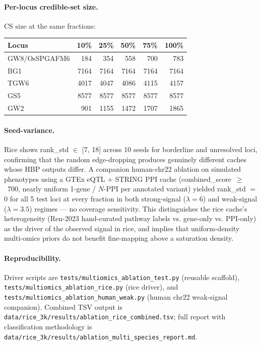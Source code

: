 \paragraph{Per-locus credible-set size.} CS size at the same fractions:

\begin{center}
\begin{tabular}{lrrrrr}
\toprule
\textbf{Locus} & \textbf{10\%} & \textbf{25\%} & \textbf{50\%} & \textbf{75\%} & \textbf{100\%} \\
\midrule
GW8/OsSPGAFM6  &  184 &  354 &  558 &  700 &  783 \\
BG1          & 7164 & 7164 & 7164 & 7164 & 7164 \\
TGW6         & 4017 & 4047 & 4086 & 4115 & 4157 \\
GS5          & 8577 & 8577 & 8577 & 8577 & 8577 \\
GW2          &  901 & 1155 & 1472 & 1707 & 1865 \\
\bottomrule
\end{tabular}
\end{center}

\paragraph{Seed-variance.} Rice shows rank\_std $\in$ [7, 18] across 10
seeds for borderline and unresolved loci, confirming that the random
edge-dropping produces genuinely different caches whose HBP outputs
differ. A companion human-chr22 ablation on simulated phenotypes using a
GTEx eQTL + STRING PPI cache (combined\_score~$\geq$~700, nearly uniform
1-gene / $N$-PPI per annotated variant) yielded rank\_std $=$ 0 for all
5 test loci at every fraction in both strong-signal ($\lambda=6$) and
weak-signal ($\lambda=3.5$) regimes --- no coverage sensitivity. This
distinguishes the rice cache's heterogeneity (Ren-2023 hand-curated
pathway labels vs. gene-only vs. PPI-only) as the driver of the
observed signal in rice, and implies that uniform-density multi-omics
priors do not benefit fine-mapping above a saturation density.

\paragraph{Reproducibility.} Driver scripts are
\texttt{tests/multiomics\_ablation\_test.py} (reusable scaffold),
\texttt{tests/multiomics\_ablation\_rice.py} (rice driver), and
\texttt{tests/multiomics\_ablation\_human\_weak.py} (human chr22
weak-signal companion). Combined TSV output is
\texttt{data/rice\_3k/results/ablation\_rice\_combined.tsv};
full report with classification methodology is
\texttt{data/rice\_3k/results/ablation\_multi\_species\_report.md}.

